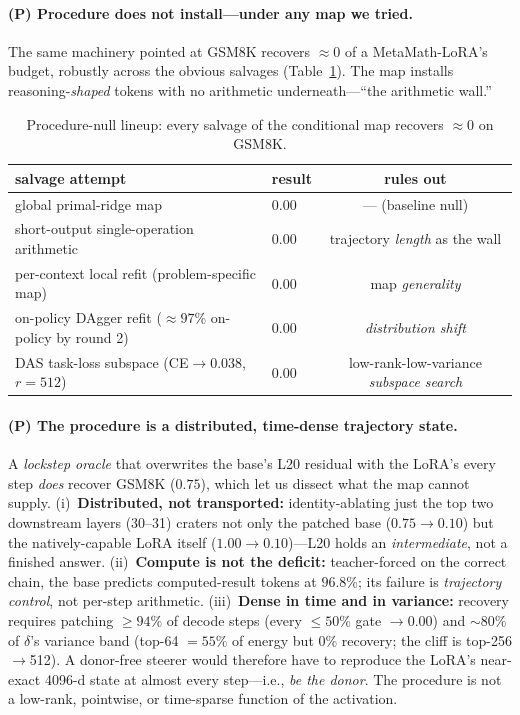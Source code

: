 \documentclass{article}
\begin{document}
\paragraph{(P) Procedure does not install---under any map we tried.}
The same machinery pointed at GSM8K recovers $\approx 0$ of a MetaMath-LoRA's budget, robustly across
the obvious salvages (Table~\ref{tab:procedure}). The map installs reasoning-\emph{shaped} tokens with
no arithmetic underneath---``the arithmetic wall.''

\begin{table}[h]
\centering
\caption{Procedure-null lineup: every salvage of the conditional map recovers $\approx 0$ on GSM8K.}
\label{tab:procedure}
\small
\setlength{\tabcolsep}{5pt}
\begin{tabular}{llc}
\toprule
salvage attempt & result & rules out \\
\midrule
global primal-ridge map & 0.00 & --- (baseline null) \\
short-output single-operation arithmetic & 0.00 & trajectory \emph{length} as the wall \\
per-context local refit (problem-specific map) & 0.00 & map \emph{generality} \\
on-policy DAgger refit (${\approx}97\%$ on-policy by round 2) & 0.00 & \emph{distribution shift} \\
DAS task-loss subspace (CE${\to}0.038$, $r{=}512$) & 0.00 & low-rank-low-variance \emph{subspace search} \\
\bottomrule
\end{tabular}
\end{table}

\paragraph{(P) The procedure is a distributed, time-dense trajectory state.}
A \emph{lockstep oracle} that overwrites the base's L20 residual with the LoRA's every step \emph{does}
recover GSM8K ($0.75$), which let us dissect what the map cannot supply. (i)~\textbf{Distributed, not
transported:} identity-ablating just the top two downstream layers (30--31) craters not only the
patched base ($0.75 \to 0.10$) but the natively-capable LoRA itself ($1.00 \to 0.10$)---L20 holds an
\emph{intermediate}, not a finished answer. (ii)~\textbf{Compute is not the deficit:} teacher-forced
on the correct chain, the base predicts computed-result tokens at $96.8\%$; its failure is
\emph{trajectory control}, not per-step arithmetic. (iii)~\textbf{Dense in time and in variance:}
recovery requires patching ${\geq}94\%$ of decode steps (every ${\leq}50\%$ gate $\to 0.00$) and
${\sim}80\%$ of $\delta$'s variance band (top-64 $=55\%$ of energy but $0\%$ recovery; the cliff is
top-256$\to$512). A donor-free steerer would therefore have to reproduce the LoRA's near-exact
4096-d state at almost every step---i.e., \emph{be the donor}. The procedure is not a low-rank,
pointwise, or time-sparse function of the activation.
\end{document}
